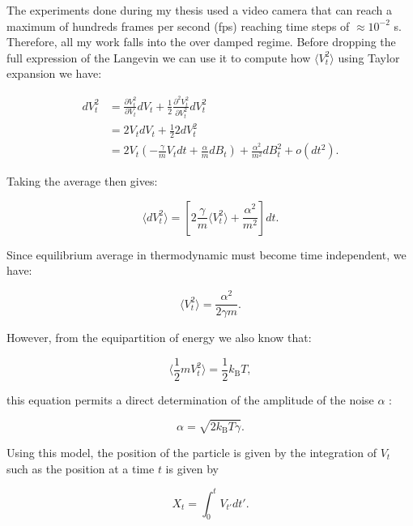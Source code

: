 The experiments done during my thesis used a video camera that can reach a maximum of hundreds frames per second (\gls{fps}) reaching time steps of $\approx 10^{-2}$ s. Therefore, all my work falls into the over damped regime. Before dropping the full expression of the Langevin we can use it to compute how $\langle V_t ^2 \rangle$ using Taylor expansion we have:

\begin{equation}
	\begin{aligned}
	dV_t^2 &= \frac{\partial V_t ^ 2}{\partial V_t} d V_t + \frac{1}{2} \frac{\partial ^2 V_t^2}{\partial V_t ^2} dV_t^2  \\
	& = 2 V_t dV_t + \frac{1}{2} 2dV_t^2 \\
	& = 2V_t\left( -\frac{\gamma}{m}V_tdt + \frac{\alpha}{m}dB_t  \right) + \frac{\alpha^2}{m^2}dB_t ^2 + o(dt^2).
	\end{aligned}
\end{equation}

Taking the average then gives:

\begin{equation}
	\langle dV_t^2 \rangle = \left[2 \frac{\gamma}{m} \langle V_t ^2 \rangle + \frac{\alpha^2}{m^2}\right]dt.
\end{equation}

Since equilibrium average in thermodynamic must become time independent, we have:

\begin{equation}
	\langle V_t ^2\rangle = \frac{\alpha ^2}{2 \gamma m}. 
\end{equation}

However, from the equipartition of energy we also know that:

\begin{equation}
	\langle \frac{1}{2} m V_t ^2 \rangle  = \frac{1}{2} k_\mathrm{B} T,
\end{equation}

this equation permits a direct determination of the amplitude of the noise $\alpha$ : 

\begin{equation}
	\alpha = \sqrt{2k_\mathrm{B}T \gamma}.
\end{equation}

Using this model, the position of the particle is given by the integration of $V_t$ such as the position at a time $t$ is given by

\begin{equation}
	X_t = \int _0 ^t V_{t'}dt'.
	\label{Eq:particle_position}
\end{equation}

